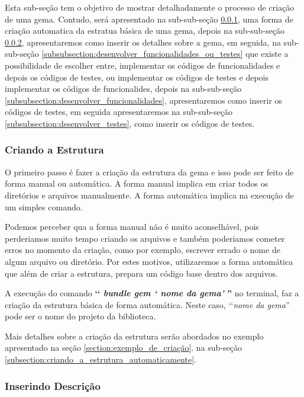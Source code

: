 Esta sub-seção tem o objetivo de mostrar detalhadamente o processo de criação de uma gema. Contudo, será
apresentado na sub-sub-seção \ref{subsubsection:criando_a_estrutura}, uma forma de criação automatica da
estratua básica de uma gema, depois na sub-sub-seção \ref{subsubsection:inserindo_descrição},
apresentaremos como inserir os detalhes sobre a gema, em seguida, na sub-sub-seção
\ref{subsubsection:desenvolver_funcionalidades_ou_testes} que existe a possibilidade de escolher
entre, implementar os códigos de funcionalidades e depois os códigos de testes, ou implementar os
códigos de testes e depois implementar os códigos de funcionalides, depois na sub-sub-seção
\ref{subsubsection:desenvolver_funcionalidades}, apresentaremos como inserir os códigos de testes, em
seguida apresentaremos na sub-sub-seção \ref{subsubsection:desenvolver_testes}, como inserir os
códigos de testes.


\subsubsection{Criando a Estrutura}
\label{subsubsection:criando_a_estrutura}


O primeiro passo é fazer a criação da estrutura da gema e isso pode ser feito de forma manual ou automática.
A forma manual implica em criar todos os diretórios e arquivos manualmente. A forma automática implica na
execução de um simples comando.

Podemos perceber qua a forma manual não é muito aconselhável, pois perderiamos muito tempo criando
os arquivos e também poderiamos cometer erros no momento da criação, como por exemplo, escrever errado
o nome de algum arquivo ou diretório. Por estes motivos, utilizaremos a forma automática
que além de criar a estrutura, prepara um código base dentro dos arquivos.

A execução do comando \textbf{‘‘ \emph{bundle gem ‘ nome da gema'} ''} no terminal, faz a criação da
estrutura básica de forma automática. Neste caso, ‘‘\emph{nome da gema}'' pode ser o nome do projeto
da biblioteca.

Mais detalhes sobre a criação da estrutura serão abordados no exemplo apresentado na seção
\ref{section:exemplo_de_criação}. na sub-seção \ref{subsection:criando_a_estrutura_automaticamente}.


\subsubsection{Inserindo Descrição}
\label{subsubsection:inserindo_descrição}


